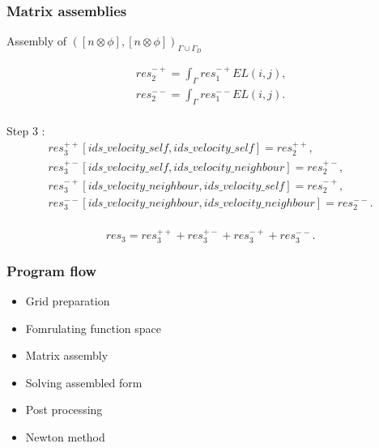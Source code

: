 \documentclass{beamer}
\begin{document}
\begin{frame}
\frametitle{Matrix assemblies}

\begin{block}{Assembly of $([n \otimes \phi], [n \otimes \phi])_{\Gamma \cup \Gamma_D}$}

\begin{equation}
\begin{split}
res_2^{-+} = \int_{\Gamma} res_1^{-+} EL(i,j) \textrm{,}\\
res_2^{--} = \int_{\Gamma} res_1^{--} EL(i,j) \textrm{.}\\
\end{split}
\end{equation}

Step 3 :
\begin{equation}
\begin{split}
res_3^{++}[ids\_velocity\_self,ids\_velocity\_self] = res_2^{++} \textrm{,}\\
res_3^{+-}[ids\_velocity\_self,ids\_velocity\_neighbour] = res_2^{+-} \textrm{,}\\
res_3^{-+}[ids\_velocity\_neighbour,ids\_velocity\_self] = res_2^{-+} \textrm{,}\\
res_3^{--}[ids\_velocity\_neighbour,ids\_velocity\_neighbour] = res_2^{--} \textrm{.}\\
\end{split}
\end{equation}

\begin{equation}
res_3 = res_3^{++} + res_3^{+-} + res_3^{-+} + res_3^{--} \textrm{.}
\end{equation}

\end{block}

\end{frame}

\begin{frame}
\frametitle{Program flow}
\begin{itemize}

\item Grid preparation
\item Fomrulating function space
\item Matrix assembly
\item Solving assembled form
\item Post processing
\item Newton method

\end{itemize}


\end{frame}
\end{document}
